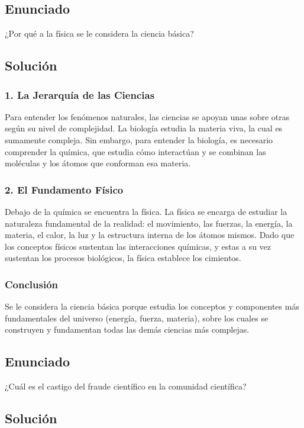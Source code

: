 \documentclass[12pt, a4paper]{article}
\begin{document}
\newpage

\subsection*{Enunciado}
¿Por qué a la física se le considera la ciencia básica?

\subsection*{Solución}

\subsubsection*{1. La Jerarquía de las Ciencias}
Para entender los fenómenos naturales, las ciencias se apoyan unas sobre otras según su nivel de complejidad. La biología estudia la materia viva, la cual es sumamente compleja. Sin embargo, para entender la biología, es necesario comprender la química, que estudia cómo interactúan y se combinan las moléculas y los átomos que conforman esa materia.

\subsubsection*{2. El Fundamento Físico}
Debajo de la química se encuentra la física. La física se encarga de estudiar la naturaleza fundamental de la realidad: el movimiento, las fuerzas, la energía, la materia, el calor, la luz y la estructura interna de los átomos mismos. Dado que los conceptos físicos sustentan las interacciones químicas, y estas a su vez sustentan los procesos biológicos, la física establece los cimientos.

\subsubsection*{Conclusión}
Se le considera la ciencia básica porque estudia los conceptos y componentes más fundamentales del universo (energía, fuerza, materia), sobre los cuales se construyen y fundamentan todas las demás ciencias más complejas.

\newpage

\subsection*{Enunciado}
¿Cuál es el castigo del fraude científico en la comunidad científica?

\subsection*{Solución}
\end{document}
